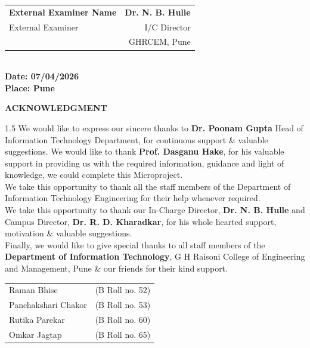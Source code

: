 \documentclass[12pt, a4paper]{article}
\begin{document}
	\noindent
	\begin{tabular*}{\textwidth}{@{\extracolsep{\fill}}lr}
		\colorbox{phgreen}{\textbf{External Examiner Name}} & \textbf{Dr. N. B. Hulle} \\
		External Examiner & I/C Director \\
		& GHRCEM, Pune \\
	\end{tabular*}\\[0.5cm]
	
	\noindent \textbf{Date: 07/04/2026}\\
	\noindent \textbf{Place: Pune}
	
	\newpage
	
	\thispagestyle{empty}
	\begin{center}
		{\Large \textbf{ACKNOWLEDGMENT}}\\[1cm]
	\end{center}
	
	\begin{spacing}{1.5}
		\noindent We would like to express our sincere thanks to \textbf{Dr. Poonam Gupta} Head of Information Technology Department, for continuous support \& valuable suggestions. We would like to thank \textbf{Prof. Dasganu Hake}, for his valuable support in providing us with the required information, guidance and light of knowledge, we could complete this Microproject.\\
		
		\noindent We take this opportunity to thank all the staff members of the Department of Information Technology Engineering for their help whenever required.\\
		
		\noindent We take this opportunity to thank our In-Charge Director, \textbf{Dr. N. B. Hulle} and Campus Director, \textbf{Dr. R. D. Kharadkar}, for his whole hearted support, motivation \& valuable suggestions.\\
		
		\noindent Finally, we would like to give special thanks to all staff members of the \textbf{Department of Information Technology}, G H Raisoni College of Engineering and Management, Pune \& our friends for their kind support.\\[0.5cm]
	\end{spacing}

	
	\begin{tabular}{ll}
		Raman Bhise & (B Roll no. 52) \\
		Panchakshari Chakor & (B Roll no. 53) \\
		Rutika Parekar & (B Roll no. 60) \\
		Omkar Jagtap & (B Roll no. 65) \\
	\end{tabular}
	
\end{document}
